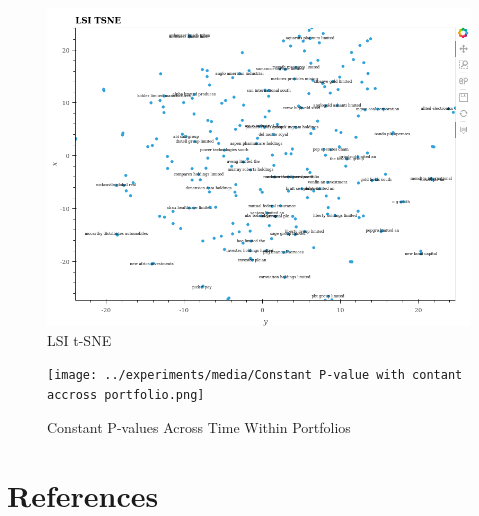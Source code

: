 \documentclass[11pt]{article}
\makeatletter
\def\maxwidth{\ifdim\Gin@nat@width>\linewidth\linewidth
    \else\Gin@nat@width\fi}
\let\Oldincludegraphics\includegraphics
\renewcommand{\includegraphics}[1]{\Oldincludegraphics[width=.8\maxwidth]{#1}}
\makeatother
\begin{document}
\begin{figure}
\centering
\includegraphics{../experiments/media/LSI TSNE.png}
\caption{LSI t-SNE}
\end{figure}

\begin{figure}
\centering
\texttt{[image: ../experiments/media/Constant P-value with contant accross portfolio.png]}
\caption{Constant P-values Across Time Within Portfolios}
\end{figure}

    \hypertarget{references}{%
\section{References}\label{references}}


    
    
    
    
\end{document}
